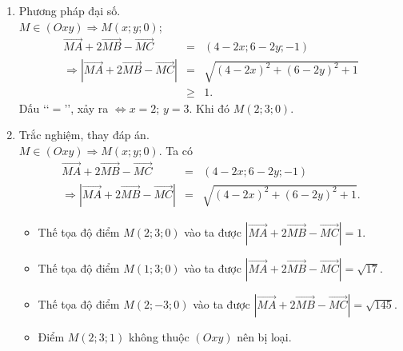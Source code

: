 \begin{ex}
{\begin{enumerate}[\bf Cách 1.]
\begin{eqnarray*}
				&=&\left|2\cdot \vec{MD}+\vec{CB}\right|\\
				&=&\left|2\cdot \vec{MD}+2\cdot \vec{ED}\right|\\
				&=&2\left|2\cdot \vec{FD}\right|\\
				&=&4\cdot FD.
			\end{eqnarray*}
			Ta lại có 
			\begin{itemize}
				\item $M(x;y;0)$, $D\left(\dfrac{5}{2};\dfrac{3}{2};\dfrac{1}{2}\right)$, $E(3;0;0)$, $F\left(\dfrac{x+3}{2};\dfrac{y}{2};0\right)$;
				\item $FD_{\min} \Leftrightarrow$ $F$ là hình chiếu của $D$ trên mp$(Oxy)\Leftrightarrow \heva{&x=2\\&y=3}\Leftrightarrow M(2;3;0)$.
			\end{itemize}
			\item Phương pháp đại số.\\
			$M\in (Oxy)\Rightarrow M(x;y;0)$;
			\begin{eqnarray*}
				\vec{MA}+2\vec{MB}-\vec{MC}&=&(4-2x;6-2y;-1)\\
				\Rightarrow \left|\vec{MA}+2\vec{MB}-\vec{MC}\right|&=&\sqrt{\left(4-2x\right)^2+\left(6-2y\right)^2+1}\\
				& \ge & 1.
			\end{eqnarray*}
			Dấu \lq\lq $=$\rq\rq, xảy ra $\Leftrightarrow x=2$; $y=3$. Khi đó $M(2;3;0)$.
			\item Trắc nghiệm, thay đáp án.\\
			$M\in (Oxy)\Rightarrow M(x;y;0)$. Ta có
			\begin{eqnarray*}
				\vec{MA}+2\vec{MB}-\vec{MC}&=&(4-2x;6-2y;-1)\\
				\Rightarrow \left|\vec{MA}+2\vec{MB}-\vec{MC}\right|&=&\sqrt{(4-2x)^2+(6-2y)^2+1}.
			\end{eqnarray*}
			\begin{itemize}
				\item Thế tọa độ điểm $M(2;3;0)$ vào ta được $\left|\vec{MA}+2\vec{MB}-\vec{MC}\right|=1$.
				\item Thế tọa độ điểm $M(1;3;0)$ vào ta được $\left|\vec{MA}+2\vec{MB}-\vec{MC}\right|=\sqrt{17}$.
				\item Thế tọa độ điểm $M(2;-3;0)$ vào ta được $\left|\vec{MA}+2\vec{MB}-\vec{MC}\right|=\sqrt{145}$.
				\item Điểm $M(2;3;1)$ không thuộc $\left(Oxy\right)$ nên bị loại.
			\end{itemize}
		\end{enumerate}
	}
\end{ex}

